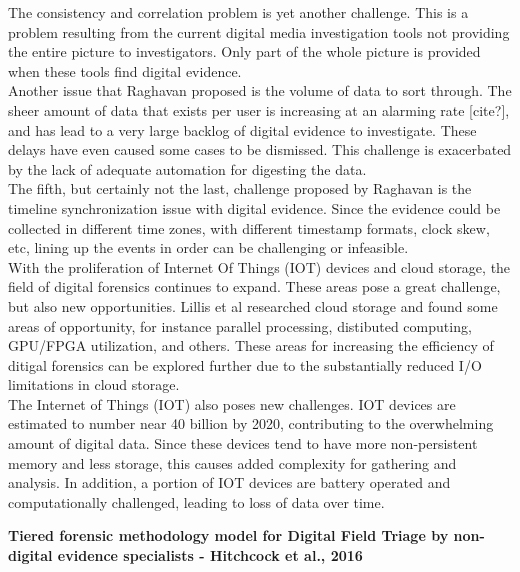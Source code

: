 \documentclass[12pt]{article}
\begin{document}
The consistency and correlation problem is yet another challenge.  This is a problem resulting from the current
digital media investigation tools not providing the entire picture to investigators.  Only part of the whole
picture is provided when these tools find digital evidence.\\

Another issue that Raghavan\cite{raghavan2013digital} proposed is the volume of data to sort through.  The sheer
amount of data that exists per user is increasing at an alarming rate [cite?], and has lead to a very large
backlog of digital evidence to investigate.  These delays have even caused some cases to be dismissed.  This
challenge is exacerbated by the lack of adequate automation for digesting the data.\\

The fifth, but certainly not the last, challenge proposed by Raghavan\cite{raghavan2013digital} is the timeline
synchronization issue with digital evidence.  Since the evidence could be collected in different time zones, 
with different timestamp formats, clock skew, etc, lining up the events in order can be challenging or
infeasible.\\

With the proliferation of Internet Of Things (IOT) devices and cloud storage, the field of digital forensics
continues to expand.  These areas pose a great challenge, but also new opportunities.  Lillis et
al\cite{lillis2016current} researched cloud storage and found some areas of opportunity, for instance parallel
processing, distibuted computing, GPU/FPGA utilization, and others.  These areas for increasing the efficiency
of ditigal forensics can be explored further due to the substantially reduced I/O limitations in cloud storage.\\

The Internet of Things (IOT) also poses new challenges.  IOT devices are estimated to number near 40 billion by
2020, contributing to the overwhelming amount of digital data.  Since these devices tend to have more 
non-persistent memory and less storage, this causes added complexity for gathering and analysis.  In addition,
a portion of IOT devices are battery operated and computationally challenged, leading to loss of data over
time.\\
\vspace{0.5 cm}

\textbf{Tiered forensic methodology model for Digital Field Triage by non-digital evidence specialists - Hitchcock et al., 2016\cite{hitchcock2016tiered}}\\
\\
\end{document}
